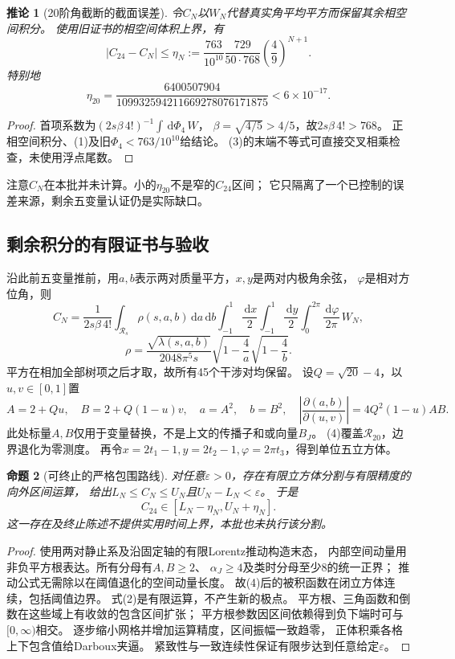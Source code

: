 \documentclass[11pt,a4paper]{ctexart}
\theoremstyle{cnplain}\newtheorem{proposition}{命题}[section]
\newtheorem{corollary}[proposition]{推论}
\newcommand{\dd}{\,\mathrm d}
\begin{document}
\begin{corollary}[20阶角截断的截面误差]\label{cor:eta}
令$C_N$以$W_N$代替真实角平均平方而保留其余相空间积分。
使用旧证书的相空间体积上界，有
\[
 |C_{24}-C_N|
 \le\eta_N:=
 \frac{763}{10^{10}}\frac{729}{50\cdot768}
          \left(\frac49\right)^{N+1}.
\]
特别地
\[
 \eta_{20}=
 \frac{6400507904}{109932594211669278076171875}
 <6\times10^{-17}.                                    \tag{3}
\]
\end{corollary}
\begin{proof}
首项系数为$(2s\beta\,4!)^{-1}\int \dd\Phi_4\,W$，
$\beta=\sqrt{4/5}>4/5$，故$2s\beta\,4!>768$。
正相空间积分、(1)及旧$\Phi_4<763/10^{10}$给结论。
(3)的末端不等式可直接交叉相乘检查，未使用浮点尾数。
\end{proof}

注意$C_N$在本批并未计算。小的$\eta_{20}$不是窄的$C_{24}$区间；
它只隔离了一个已控制的误差来源，剩余五变量认证仍是实际缺口。

\subsection{剩余积分的有限证书与验收}
沿此前五变量推前，用$a,b$表示两对质量平方，$x,y$是两对内极角余弦，
$\varphi$是相对方位角，则
\[
 C_N=\frac1{2s\beta\,4!}
 \int_{\mathcal R_s}\rho(s,a,b)\dd a\dd b
 \int_{-1}^1\frac{\dd x}2\int_{-1}^1\frac{\dd y}2
 \int_0^{2\pi}\frac{\dd\varphi}{2\pi}\,W_N,
\]
\[
 \rho=\frac{\sqrt{\lambda(s,a,b)}}{2048\pi^5s}
          \sqrt{1-\frac4a}\sqrt{1-\frac4b}.
\]
平方在相加全部树项之后才取，故所有45个干涉对均保留。
设$Q=\sqrt{20}-4$，以$u,v\in[0,1]$置
\[
 A=2+Qu,\quad B=2+Q(1-u)v,\quad a=A^2,\quad b=B^2,
 \quad \left|\frac{\partial(a,b)}{\partial(u,v)}\right|
       =4Q^2(1-u)AB.                                   \tag{4}
\]
此处标量$A,B$仅用于变量替换，不是上文的传播子和或向量$B_J$。
(4)覆盖$\mathcal R_{20}$，边界退化为零测度。
再令$x=2t_1-1,y=2t_2-1,\varphi=2\pi t_3$，得到单位五立方体。

\begin{proposition}[可终止的严格包围路线]\label{prop:boxes}
对任意$\varepsilon>0$，存在有限立方体分割与有限精度的向外区间运算，
给出$L_N\le C_N\le U_N$且$U_N-L_N<\varepsilon$。
于是
\[
 C_{24}\in[L_N-\eta_N,U_N+\eta_N].
\]
这一存在及终止陈述不提供实用时间上界，本批也未执行该分割。
\end{proposition}
\begin{proof}
使用两对静止系及沿固定轴的有限Lorentz推动构造末态，
内部空间动量用非负平方根表达。所有分母有$A,B\ge2$、
$\alpha_J\ge4$及类时分母至少8的统一正界；
推动公式无需除以在阈值退化的空间动量长度。
故(4)后的被积函数在闭立方体连续，包括阈值边界。
式(2)是有限运算，不产生新的极点。
平方根、三角函数和倒数在这些域上有收敛的包含区间扩张；
平方根参数因区间依赖得到负下端时可与$[0,\infty)$相交。
逐步缩小网格并增加运算精度，区间振幅一致趋零，
正体积乘各格上下包含值给Darboux夹逼。
紧致性与一致连续性保证有限步达到任意给定$\varepsilon$。
\end{proof}
\end{document}
